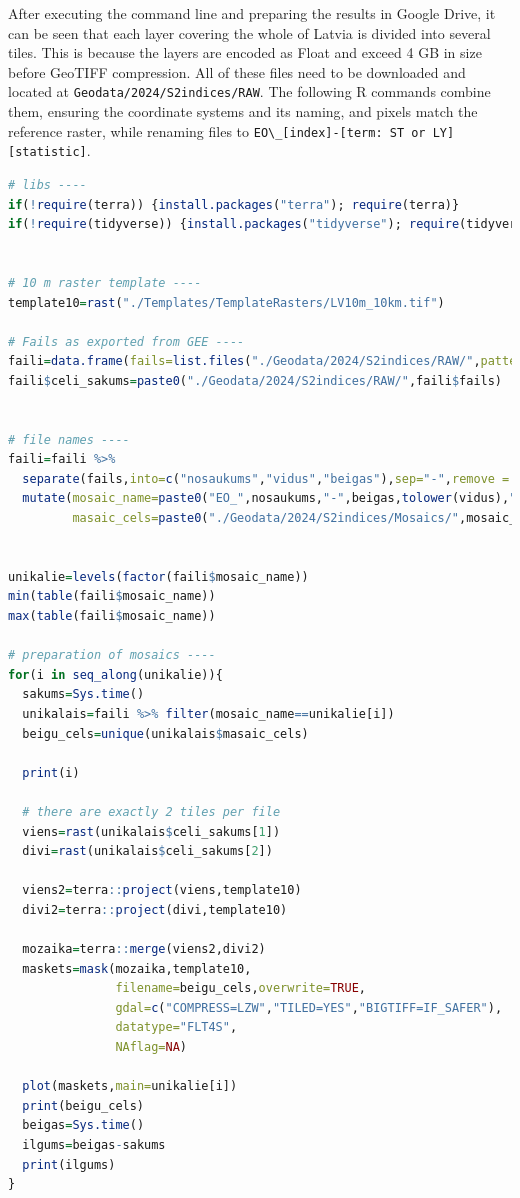 \documentclass[
]{book}
\newcommand{\passthrough}[1]{#1}
\begin{document}
After executing the command line and preparing the results in Google Drive, it
can be seen that each layer covering the whole of Latvia is divided into
several tiles. This is because the layers are encoded as Float and exceed 4 GB
in size before GeoTIFF compression. All of these files need to be downloaded and
located at \passthrough{\lstinline!Geodata/2024/S2indices/RAW!}. The following R commands combine them,
ensuring the coordinate systems and its naming, and pixels match the reference
raster, while renaming files to \passthrough{\lstinline!EO\_[index]-[term: ST or LY][statistic]!}.

\begin{lstlisting}[language=R]
# libs ----
if(!require(terra)) {install.packages("terra"); require(terra)}
if(!require(tidyverse)) {install.packages("tidyverse"); require(tidyverse)}


# 10 m raster template ----
template10=rast("./Templates/TemplateRasters/LV10m_10km.tif")

# Fails as exported from GEE ----
faili=data.frame(fails=list.files("./Geodata/2024/S2indices/RAW/",pattern = ".tif"))
faili$celi_sakums=paste0("./Geodata/2024/S2indices/RAW/",faili$fails)


# file names ----
faili=faili %>% 
  separate(fails,into=c("nosaukums","vidus","beigas"),sep="-",remove = FALSE) %>% 
  mutate(mosaic_name=paste0("EO_",nosaukums,"-",beigas,tolower(vidus),".tif"),
         masaic_cels=paste0("./Geodata/2024/S2indices/Mosaics/",mosaic_name))


unikalie=levels(factor(faili$mosaic_name))
min(table(faili$mosaic_name))
max(table(faili$mosaic_name))

# preparation of mosaics ----
for(i in seq_along(unikalie)){
  sakums=Sys.time()
  unikalais=faili %>% filter(mosaic_name==unikalie[i])
  beigu_cels=unique(unikalais$masaic_cels)
  
  print(i)
  
  # there are exactly 2 tiles per file
  viens=rast(unikalais$celi_sakums[1])
  divi=rast(unikalais$celi_sakums[2])
  
  viens2=terra::project(viens,template10)
  divi2=terra::project(divi,template10)
  
  mozaika=terra::merge(viens2,divi2)
  maskets=mask(mozaika,template10,
               filename=beigu_cels,overwrite=TRUE,
               gdal=c("COMPRESS=LZW","TILED=YES","BIGTIFF=IF_SAFER"),
               datatype="FLT4S",
               NAflag=NA)
  
  plot(maskets,main=unikalie[i])
  print(beigu_cels)
  beigas=Sys.time()
  ilgums=beigas-sakums
  print(ilgums)
}
\end{lstlisting}
\end{document}
